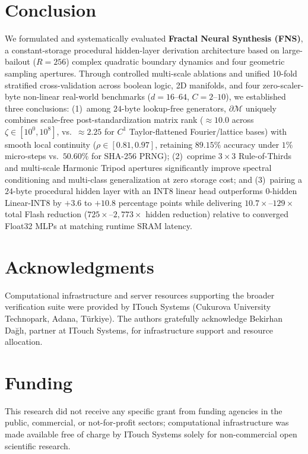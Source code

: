 \section{Conclusion}
\label{sec:conclusion}

We formulated and systematically evaluated \textbf{Fractal Neural Synthesis (FNS)}, a constant-storage procedural hidden-layer derivation architecture based on large-bailout ($R=256$) complex quadratic boundary dynamics and four geometric sampling apertures. Through controlled multi-scale ablations and unified 10-fold stratified cross-validation across boolean logic, 2D manifolds, and four zero-scaler-byte non-linear real-world benchmarks ($d=16\text{--}64$, $C=2\text{--}10$), we established three conclusions: (1)~among $24\text{-byte}$ lookup-free generators, $\partial\mathcal{M}$ uniquely combines scale-free post-standardization matrix rank ($\approx 10.0$ across $\zeta \in [10^0,10^8]$, vs.\ $\approx 2.25$ for $C^1$ Taylor-flattened Fourier/lattice bases) with smooth local continuity ($\rho\in[0.81, 0.97]$, retaining $89.15\%$ accuracy under $1\%$ micro-steps vs.\ $50.60\%$ for SHA-256 PRNG); (2)~coprime $3\times 3$ Rule-of-Thirds and multi-scale Harmonic Tripod apertures significantly improve spectral conditioning and multi-class generalization at zero storage cost; and (3)~pairing a $24\text{-byte}$ procedural hidden layer with an INT8 linear head outperforms $0\text{-hidden}$ Linear-INT8 by $+3.6$ to $+10.8$ percentage points while delivering $10.7\times$--$129\times$ total Flash reduction ($725\times$--$2{,}773\times$ hidden reduction) relative to converged Float32 MLPs at matching runtime SRAM latency.

\section*{Acknowledgments}
Computational infrastructure and server resources supporting the broader verification suite were provided by ITouch Systems (Cukurova University Technopark, Adana, T\"{u}rkiye). The authors gratefully acknowledge Bekirhan Da\u{g}l\i, partner at ITouch Systems, for infrastructure support and resource allocation.

\section*{Funding}
This research did not receive any specific grant from funding agencies in the public, commercial, or not-for-profit sectors; computational infrastructure was made available free of charge by ITouch Systems solely for non-commercial open scientific research.


